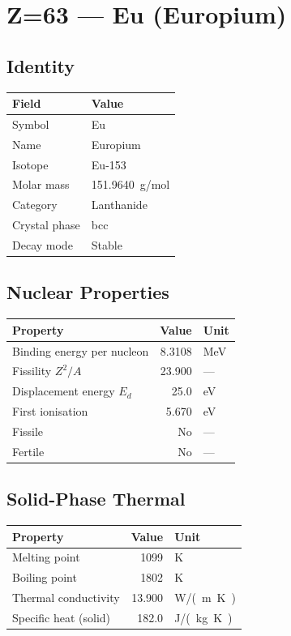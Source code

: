 \documentclass[11pt,a4paper]{article}
\begin{document}
\newpage

\section{Z=63 --- Eu (Europium)}
\label{sec:Z63}

\subsection{Identity}
\begin{tabular}{ll}
  \toprule
  Field & Value \\
  \midrule
  Symbol & Eu \\
  Name & Europium \\
  Isotope & Eu-153 \\
  Molar mass & \SI{151.9640}{g/mol} \\
  Category & Lanthanide \\
  Crystal phase & bcc \\
  Decay mode & Stable \\
  \bottomrule
\end{tabular}

\subsection{Nuclear Properties}
\begin{tabular}{lrl}
  \toprule
  Property & Value & Unit \\
  \midrule
  Binding energy per nucleon & 8.3108 & \si{MeV} \\
  Fissility $Z^2/A$ & 23.900 & --- \\
  Displacement energy $E_d$ & 25.0 & \si{eV} \\
  First ionisation & 5.670 & \si{eV} \\
  Fissile & No & --- \\
  Fertile & No & --- \\
  \bottomrule
\end{tabular}

\subsection{Solid-Phase Thermal}
\begin{tabular}{lrl}
  \toprule
  Property & Value & Unit \\
  \midrule
  Melting point & 1099 & \si{K} \\
  Boiling point & 1802 & \si{K} \\
  Thermal conductivity & 13.900 & \si{W/(m.K)} \\
  Specific heat (solid) & 182.0 & \si{J/(kg.K)} \\
  \bottomrule
\end{tabular}
\end{document}
